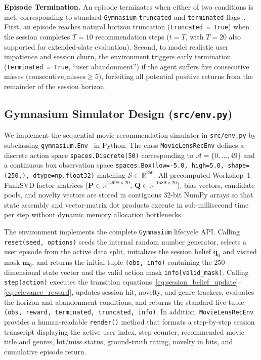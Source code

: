 \textbf{Episode Termination.} An episode terminates when either of two conditions is met, corresponding to standard \texttt{Gymnasium} \texttt{truncated} and \texttt{terminated} flags~\cite{towers2024gymnasium}. First, an episode reaches natural horizon truncation (\texttt{truncated = True}) when the session completes $T = 10$ recommendation steps ($t = T$, with $T = 20$ also supported for extended-slate evaluation). Second, to model realistic user impatience and session churn, the environment triggers early termination (\texttt{terminated = True}, ``user abandonment'') if the agent suffers five consecutive misses ($\text{consecutive\_misses} \ge 5$), forfeiting all potential positive returns from the remainder of the session horizon.

\subsection{Gymnasium Simulator Design (\texttt{src/env.py})}
\label{subsec:gym_impl}

We implement the sequential movie recommendation simulator in \texttt{src/env.py} by subclassing \texttt{gymnasium.Env}~\cite{towers2024gymnasium} in Python. The class \texttt{MovieLensRecEnv} defines a discrete action space \texttt{spaces.Discrete(50)} corresponding to $\mathcal{A} = \{0, \dots, 49\}$ and a continuous box observation space \texttt{spaces.Box(low=-5.0, high=5.0, shape=(250,), dtype=np.float32)} matching $\mathcal{S} \subset \mathbb{R}^{250}$. All precomputed Workshop~1 FunkSVD factor matrices ($\mathbf{P} \in \mathbb{R}^{14998 \times 20}$, $\mathbf{Q} \in \mathbb{R}^{11589 \times 20}$), bias vectors, candidate pools, and novelty vectors are stored in contiguous 32-bit NumPy arrays so that state assembly and vector-matrix dot products execute in sub-millisecond time per step without dynamic memory allocation bottlenecks.

The environment implements the complete \texttt{Gymnasium} lifecycle API. Calling \texttt{reset(seed, options)} seeds the internal random number generator, selects a user episode from the active data split, initializes the session belief $\bar{\mathbf{q}}_0$ and visited mask $\mathbf{m}_0$, and returns the initial tuple \texttt{(obs, info)} containing the $250$-dimensional state vector and the valid action mask \texttt{info[\textquotesingle valid\_mask\textquotesingle]}. Calling \texttt{step(action)} executes the transition equations~\eqref{eq:session_belief_update}--\eqref{eq:relevance_reward}, updates session hit, novelty, and genre trackers, evaluates the horizon and abandonment conditions, and returns the standard five-tuple \texttt{(obs, reward, terminated, truncated, info)}. In addition, \texttt{MovieLensRecEnv} provides a human-readable \texttt{render()} method that formats a step-by-step session transcript displaying the active user index, step counter, recommended movie title and genres, hit/miss status, ground-truth rating, novelty in bits, and cumulative episode return.

